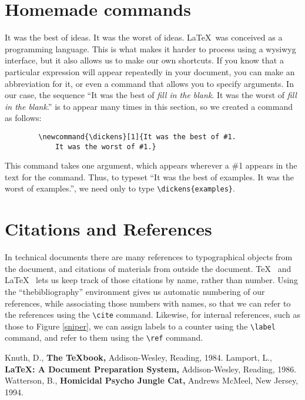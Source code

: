 \documentclass[12pt]{article}
\begin{document}
	\section{Homemade commands}
	\newcommand{\dickens}[1]{It was the best of #1. It was the worst of #1.}
	\dickens{ideas}
	\LaTeX\ was conceived as a programming language.  This is what makes it
	harder to process using a wysiwyg interface, but it also allows
	us to make our own shortcuts.
	If you know that a particular expression will appear repeatedly
	in your document, you can make an abbreviation for it, or even
	a command that allows you to specify arguments.  In our case,
	the sequence ``\dickens{{\it fill in the blank}}''
	is to appear many times in this section, so we created a command
	as follows:
	\begin{verbatim}
		\newcommand{\dickens}[1]{It was the best of #1. 
			It was the worst of #1.}
	\end{verbatim}
	This command takes one argument, which appears wherever a \#1 appears
	in the text for the command.  Thus, to typeset ``\dickens{examples}'',
	we need only to type \verb(\dickens{examples}(.
	
	\section{Citations and References}
	In technical documents there are many references to 
	typographical objects from the document, and citations
	of materials from outside the document.  \TeX\ \cite{knuth}
	and \LaTeX\ \cite{lamport} lets us keep track of those citations
	by name, rather than number.  Using the ``thebibliography'' 
	environment gives us automatic numbering of our references,
	while associating those numbers with names, so that we can
	refer to the references using the \verb(\cite( command.
	Likewise, for internal references, such as those to Figure \ref{sniper},
	we can assign labels to a counter using the \verb(\label(
	command, and refer to them using the \verb(\ref( command.
	
	\begin{thebibliography}{X}
		 Knuth, D., {\bf The \TeX book,} Addison-Wesley, Reading, 1984.
		 Lamport, L., {\bf \LaTeX: A Document Preparation System,}
		Addison-Wesley, Reading, 1986.
		 Watterson, B., {\bf Homicidal Psycho Jungle Cat,}
		Andrews McMeel, New Jersey, 1994.
	\end{thebibliography}
\end{document}
